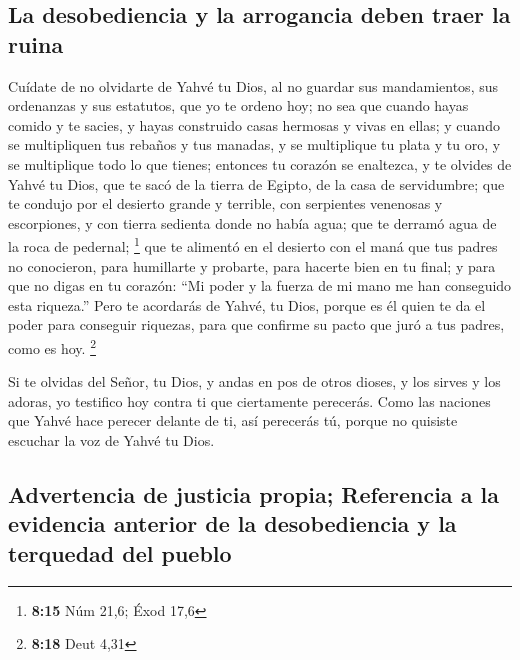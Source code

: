 \hypertarget{la-desobediencia-y-la-arrogancia-deben-traer-la-ruina}{%
\subsection{La desobediencia y la arrogancia deben traer la
ruina}\label{la-desobediencia-y-la-arrogancia-deben-traer-la-ruina}}

 Cuídate de no olvidarte de Yahvé tu Dios, al no guardar
sus mandamientos, sus ordenanzas y sus estatutos, que yo te ordeno hoy;
 no sea que cuando hayas comido y te sacies, y hayas
construido casas hermosas y vivas en ellas;  y cuando se
multipliquen tus rebaños y tus manadas, y se multiplique tu plata y tu
oro, y se multiplique todo lo que tienes;  entonces tu
corazón se enaltezca, y te olvides de Yahvé tu Dios, que te sacó de la
tierra de Egipto, de la casa de servidumbre;  que te
condujo por el desierto grande y terrible, con serpientes venenosas y
escorpiones, y con tierra sedienta donde no había agua; que te derramó
agua de la roca de pedernal; \footnote{\textbf{8:15} Núm 21,6; Éxod 17,6}
 que te alimentó en el desierto con el maná que tus
padres no conocieron, para humillarte y probarte, para hacerte bien en
tu final;  y para que no digas en tu corazón: ``Mi poder
y la fuerza de mi mano me han conseguido esta riqueza.'' 
Pero te acordarás de Yahvé, tu Dios, porque es él quien te da el poder
para conseguir riquezas, para que confirme su pacto que juró a tus
padres, como es hoy. \footnote{\textbf{8:18} Deut 4,31}

 Si te olvidas del Señor, tu Dios, y andas en pos de
otros dioses, y los sirves y los adoras, yo testifico hoy contra ti que
ciertamente perecerás.  Como las naciones que Yahvé hace
perecer delante de ti, así perecerás tú, porque no quisiste escuchar la
voz de Yahvé tu Dios.

\hypertarget{advertencia-de-justicia-propia-referencia-a-la-evidencia-anterior-de-la-desobediencia-y-la-terquedad-del-pueblo}{%
\subsection{Advertencia de justicia propia; Referencia a la evidencia
anterior de la desobediencia y la terquedad del
pueblo}\label{advertencia-de-justicia-propia-referencia-a-la-evidencia-anterior-de-la-desobediencia-y-la-terquedad-del-pueblo}}

